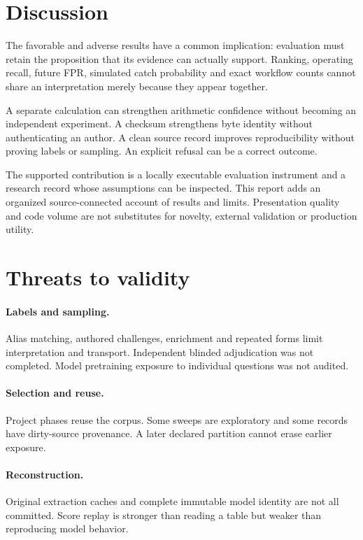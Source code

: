 \section{Discussion}
The favorable and adverse results have a common implication: evaluation must
retain the proposition that its evidence can actually support. Ranking,
operating recall, future FPR, simulated catch probability and exact workflow
counts cannot share an interpretation merely because they appear together.

A separate calculation can strengthen arithmetic confidence without becoming an
independent experiment. A checksum strengthens byte identity without
authenticating an author. A clean source record improves reproducibility without
proving labels or sampling. An explicit refusal can be a correct outcome.

The supported contribution is a locally executable evaluation instrument and a
research record whose assumptions can be inspected. This report adds an
organized source-connected account of results and limits. Presentation quality
and code volume are not substitutes for novelty, external validation or
production utility.

\section{Threats to validity}
\paragraph{Labels and sampling.}
Alias matching, authored challenges, enrichment and repeated forms limit
interpretation and transport. Independent blinded adjudication was not
completed. Model pretraining exposure to individual questions was not audited.

\paragraph{Selection and reuse.}
Project phases reuse the corpus. Some sweeps are exploratory and some records
have dirty-source provenance. A later declared partition cannot erase earlier
exposure.

\paragraph{Reconstruction.}
Original extraction caches and complete immutable model identity are not all
committed. Score replay is stronger than reading a table but weaker than
reproducing model behavior.

